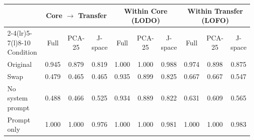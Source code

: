 \begin{tabular}{@{}lccccccccc@{}}\toprule
 & \multicolumn{3}{c}{Core $\to$ Transfer} & \multicolumn{3}{c}{Within Core (LODO)} & \multicolumn{3}{c}{Within Transfer (LOFO)}\\
\cmidrule(lr){2-4}\cmidrule(lr){5-7}\cmidrule(l){8-10}
Condition & Full & PCA-25 & J-space & Full & PCA-25 & J-space & Full & PCA-25 & J-space\\\midrule
Original & 0.945 & 0.879 & 0.819 & 1.000 & 1.000 & 0.988 & 0.974 & 0.898 & 0.875\\
Swap & 0.479 & 0.465 & 0.465 & 0.935 & 0.899 & 0.825 & 0.667 & 0.667 & 0.547\\
No system prompt & 0.488 & 0.466 & 0.525 & 0.934 & 0.889 & 0.822 & 0.631 & 0.609 & 0.565\\
Prompt only & 1.000 & 1.000 & 0.976 & 1.000 & 1.000 & 0.981 & 1.000 & 1.000 & 0.983\\
\bottomrule\end{tabular}

